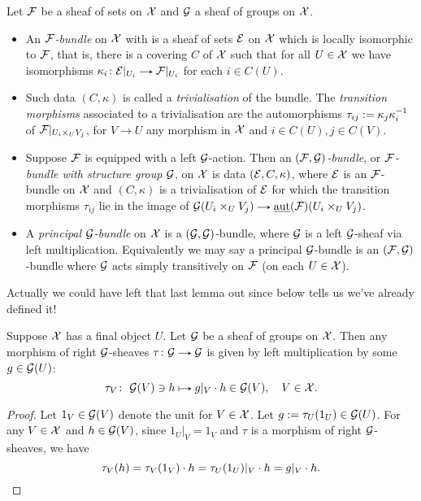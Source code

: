 \begin{definition}
  \label{bundle-sheaf}
  Let $\mathcal{F}$ be a sheaf of sets on $\mathcal{X}$ and $\mathcal{G}$ a sheaf of groups on
  $\mathcal{X}$.
  \begin{itemize}
  \item An \emph{$\mathcal{F}$-bundle} on $\mathcal{X}$ with is a sheaf of sets $\mathcal{E}$ on
    $\mathcal{X}$ which is locally isomorphic to $\mathcal{F}$, that is, there is a
    covering $C$ of $\mathcal{X}$ such that for all $U \in \mathcal{X}$ we have
    isomorphisms $\kappa_i \c \E|_{U_i} \to \F|_{U_i}$ for each $i \in
    C(U)$.
  \item Such data $(C,\kappa)$ is called a \emph{trivialisation} of
    the bundle. The \emph{transition morphisms} associated to a
    trivialisation are the automorphisms $\tau_{ij} \mathrel{:=}
    \kappa_j\kappa_i^{-1}$ of $\mathcal{F}|_{U_i \times_U V_j}$, for $V \to U$
    any morphism in $\mathcal{X}$ and $i \in C(U), j \in C(V)$.
  \item Suppose $\mathcal{F}$ is equipped with a left $\mathcal{G}$-action. Then an
    \emph{$(\mathcal{F},\mathcal{G})$-bundle}, or \emph{$\mathcal{F}$-bundle with structure group
      $\mathcal{G}$}, on $\mathcal{X}$ is data $(\mathcal{E},C,\kappa)$, where $\mathcal{E}$ is an
    $\mathcal{F}$-bundle on $\mathcal{X}$ and $(C,\kappa)$ is a trivialisation of $\mathcal{E}$
    for which the transition morphisms $\tau_{ij}$ lie in the image of
    $\G(U_i \times_U V_j) \to \saut(\F)(U_i \times_U V_j)$.
  \item A \emph{principal $\mathcal{G}$-bundle} on $\mathcal{X}$ is a $(\mathcal{G},\mathcal{G})$-bundle,
    where $\mathcal{G}$ is a left $\mathcal{G}$-sheaf via left
    multiplication. Equivalently we may say a principal $\mathcal{G}$-bundle is
    an $(\mathcal{F},\mathcal{G})$-bundle where $\mathcal{G}$ acts simply transitively on $\mathcal{F}$
    (on each $U \in \mathcal{X}$).
  \end{itemize}
\end{definition}

Actually we could have left that last lemma out since
 below tells us we've already defined
it!

\begin{lemma}
  \label{auto-left}
  Suppose $\mathcal{X}$ has a final object $U$. Let $\mathcal{G}$ be a sheaf of groups
  on $\mathcal{X}$. Then any morphism of right $\mathcal{G}$-sheaves $\tau \c \G \to \G$
  is given by left multiplication by some $g \in \mathcal{G}(U)$:
  \[
  \tau_V \c\ \G(V) \ni h \mapsto g|_V \cdot h \in \G(V), \quad V \in
  \X.
  \]
\end{lemma}

\begin{proof}
  Let $1_V \in \mathcal{G}(V)$ denote the unit for $V \in \mathcal{X}$. Let $g \mathrel{:=}
  \tau_U(1_U) \in \mathcal{G}(U)$. For any $V \in \mathcal{X}$ and $h \in
  \mathcal{G}(V)$, since $1_U|_V = 1_V$ and $\tau$ is a morphism of right
  $\mathcal{G}$-sheaves, we have
  \[
  \tau_V(h) = \tau_V(1_V) \cdot h = \tau_U(1_U)|_V \cdot h = g|_V
  \cdot h. \qedhere
  \]
\end{proof}

